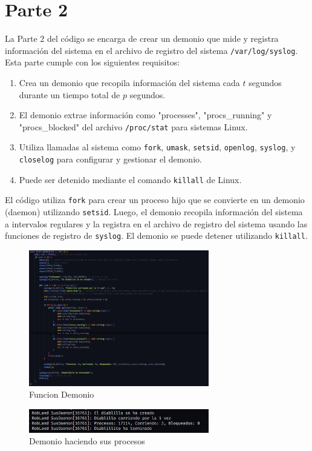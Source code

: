 \documentclass[12pt]{article}
\begin{document}
\section{Parte 2}

La Parte 2 del código se encarga de crear un demonio que mide y registra información del sistema en el archivo de registro del sistema \texttt{/var/log/syslog}. Esta parte cumple con los siguientes requisitos:

\begin{enumerate}
\item Crea un demonio que recopila información del sistema cada $t$ segundos durante un tiempo total de $p$ segundos.
\item El demonio extrae información como "processes", "procs\_running" y "procs\_blocked" del archivo \texttt{/proc/stat} para sistemas Linux.
\item Utiliza llamadas al sistema como \texttt{fork}, \texttt{umask}, \texttt{setsid}, \texttt{openlog}, \texttt{syslog}, y \texttt{closelog} para configurar y gestionar el demonio.
\item Puede ser detenido mediante el comando \texttt{killall} de Linux.
\end{enumerate}

El código utiliza \texttt{fork} para crear un proceso hijo que se convierte en un demonio (daemon) utilizando \texttt{setsid}. Luego, el demonio recopila información del sistema a intervalos regulares y la registra en el archivo de registro del sistema usando las funciones de registro de \texttt{syslog}. El demonio se puede detener utilizando \texttt{killall}.
\begin{figure}[H]
    \centering
    \includegraphics[width=0.7\textwidth]{daemon.png}
    \caption{Funcion Demonio}
\end{figure}
\begin{figure}[H]
    \centering
    \includegraphics[width=0.7\textwidth]{demonio-working.jpeg}
    \caption{Demonio haciendo sus procesos}
\end{figure}
\end{document}
